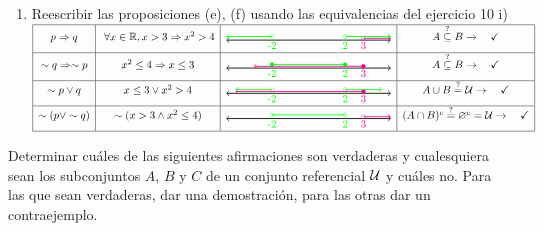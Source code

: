 \begin{enumerate}[label=\roman*)]
	\item Reescribir las proposiciones (e), (f) usando las equivalencias del ejercicio 10 i)\\
	      $
		      \begin{array}{|c|c|c|c|}
			      \hline
			      p \entonces q           & \paratodo x \en \reales, x > 3 \entonces x^2 > 4 & \doceiiicero & A \stacktext{?}{\subseteq} B \to \Tilde                     \\
			      \hline
			      \sim q \entonces \sim p & x^2 \leq 4 \entonces x \leq 3                    & \doceiiiuno  & A \stacktext{?}{\subseteq} B \to \Tilde                     \\
			      \hline
			      \sim p \lor q           & x \leq 3 \o x^2 > 4                              & \doceiiidos  & A \union B \stackrel{?}{=} \universo \to \Tilde             \\
			      \hline
			      \sim (p \lor \sim q)    & \sim (x > 3 \y x^2 \leq 4 )                      & \doceiiitres & (A \inter B)^c \stackrel{?}{=}\vacio^c=\universo \to \Tilde \\
			      \hline
		      \end{array}
	      $
\end{enumerate}

\ejercicio Determinar cuáles de las siguientes afirmaciones son verdaderas y cualesquiera sean los subconjuntos $A$, $B$ y $C$ de un conjunto referencial $\mathcal U$ y cuáles no.
Para las que sean verdaderas, dar una demostración, para las otras dar un contraejemplo.

